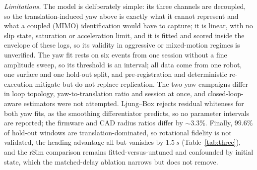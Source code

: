 \textit{Limitations.} The model is deliberately simple: its three channels are decoupled, so the translation-induced yaw above is exactly what it cannot represent and what a coupled (MIMO) identification would have to capture; it is linear, with no slip state, saturation or acceleration limit, and it is fitted and scored inside the envelope of these logs, so its validity in aggressive or mixed-motion regimes is unverified. The yaw fit rests on six events from one session without a fine amplitude sweep, so its threshold is an interval; all data come from one robot, one surface and one hold-out split, and pre-registration and deterministic re-execution mitigate but do not replace replication. The two yaw campaigns differ in loop topology, yaw-to-translation ratio and session at once, and closed-loop-aware estimators were not attempted. Ljung--Box rejects residual whiteness for both yaw fits, as the smoothing differentiator predicts, so no parameter intervals are reported; the firmware and CAD radius ratios differ by ${\sim}3.3\%$. Finally, $99.6\%$ of hold-out windows are translation-dominated, so rotational fidelity is not validated, the heading advantage all but vanishes by $\SI{1.5}{s}$ (Table~\ref{tab:three}), and the rSim comparison remains fitted-versus-untuned and confounded by initial state, which the matched-delay ablation narrows but does not remove.
